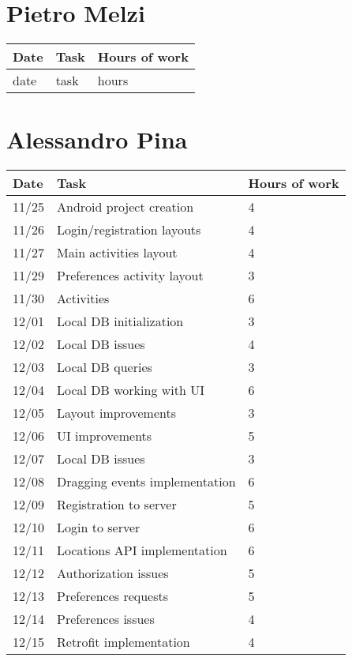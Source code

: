 \section{Pietro Melzi}
\begin{table}[H]
	\begin{tabular}{ p{2cm} p{10cm} p{3cm}}
	Date & Task & Hours of work\\
	\hline
	date & task & hours \\
	
	\end{tabular}
\end{table}

\section{Alessandro Pina}
\begin{table}[H]
	\begin{tabular}{ p{2cm} p{10cm} p{3cm}}
	Date & Task & Hours of work\\
	\hline
	11/25 & Android project creation & 4 \\
	11/26 & Login/registration layouts & 4 \\
	11/27 & Main activities layout & 4 \\
	11/29 & Preferences activity layout & 3 \\
	11/30 & Activities & 6 \\
	12/01 & Local DB initialization & 3 \\
	12/02 & Local DB issues & 4 \\
	12/03 & Local DB queries & 3 \\
	12/04 & Local DB working with UI & 6 \\
	12/05 & Layout improvements & 3 \\
	12/06 & UI improvements & 5 \\
	12/07 & Local DB issues & 3 \\
	12/08 & Dragging events implementation & 6 \\
	12/09 & Registration to server & 5 \\
	12/10 & Login to server & 6 \\
	12/11 & Locations API implementation & 6 \\
	12/12 & Authorization issues & 5 \\
	12/13 & Preferences requests & 5 \\
	12/14 & Preferences issues & 4 \\
	12/15 & Retrofit implementation & 4 \\

\end{tabular}
\end{table}
